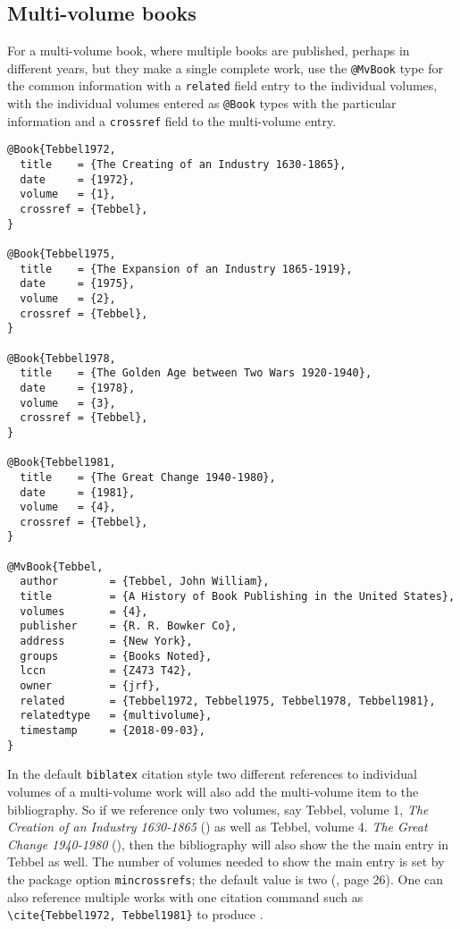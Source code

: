 \subsection{Multi-volume books}

For a multi-volume book, where multiple books are published, perhaps
in different years, but they make a single complete work, use the
\texttt{@MvBook} type for the common information with a
\texttt{related} field entry to the individual volumes, with the
individual volumes entered as \texttt{@Book} types with the
particular information and a \texttt{crossref} field to the
multi-volume entry.

\begin{verbatim}
@Book{Tebbel1972,
  title    = {The Creating of an Industry 1630-1865},
  date     = {1972},
  volume   = {1},
  crossref = {Tebbel},
}

@Book{Tebbel1975,
  title    = {The Expansion of an Industry 1865-1919},
  date     = {1975},
  volume   = {2},
  crossref = {Tebbel},
}

@Book{Tebbel1978,
  title    = {The Golden Age between Two Wars 1920-1940},
  date     = {1978},
  volume   = {3},
  crossref = {Tebbel},
}

@Book{Tebbel1981,
  title    = {The Great Change 1940-1980},
  date     = {1981},
  volume   = {4},
  crossref = {Tebbel},
}

@MvBook{Tebbel,
  author        = {Tebbel, John William},
  title         = {A History of Book Publishing in the United States},
  volumes       = {4},
  publisher     = {R. R. Bowker Co},
  address       = {New York},
  groups        = {Books Noted},
  lccn          = {Z473 T42},
  owner         = {jrf},
  related       = {Tebbel1972, Tebbel1975, Tebbel1978, Tebbel1981},
  relatedtype   = {multivolume},
  timestamp     = {2018-09-03},
}
\end{verbatim}

In the default \texttt{biblatex} citation style two different
references to individual volumes of a multi-volume work will also add
the multi-volume item to the bibliography. So if we reference only two
volumes, say Tebbel, volume 1, \textit{The Creation of an Industry
  1630-1865} (\cite{Tebbel1972}) as well as Tebbel, volume
4. \textit{The Great Change 1940-1980} (\cite{Tebbel1981}), then the
bibliography will also show the the main entry in Tebbel as well. The
number of volumes needed to show the main entry is set by the package
option \texttt{mincrossrefs}; the default value is two
(\cite{Kime2019}, page 26).  One can also reference multiple works
with one citation command such as \verb|\cite{Tebbel1972, Tebbel1981}|
to produce \cite{Tebbel1972, Tebbel1981}.

